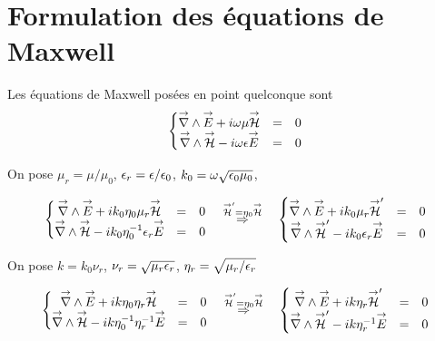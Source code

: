 \section{Formulation des équations de Maxwell}

Les équations de Maxwell posées en point quelconque sont
\begin{equation}
  \left\lbrace \begin{matrix}
  \vrot \vE + i\w\mu \vH &=& 0 \\
  \vrot \vH - i\w\eps \vE &=& 0 \\
  \end{matrix} \right.
\end{equation}

On pose \(\mu_r = \mu \slash \mu_0\), \(\eps_r = \eps \slash \eps_0\), \(k_0 = \w \sqrt {\eps_0\mu_0}\),

\begin{equation}
\left\lbrace \begin{matrix}
\vrot \vE + ik_0\eta_0\mu_r \vH &=& 0 \\
\vrot \vH - ik_0\eta_0^{-1}\eps_r \vE &=& 0 \\
\end{matrix} \right.
\quad
\overset{\vH' = \eta_0 \vH}{\Rightarrow}
\quad
\left\lbrace \begin{matrix}
\vrot \vE + ik_0\mu_r \vH' &=& 0 \\
\vrot \vH' - ik_0\eps_r \vE &=& 0 \\
\end{matrix} \right.
\end{equation}

On pose \(k=k_0\nu_r\), \(\nu_r = \sqrt{\mu_r\eps_r}\), \(\eta_r = \sqrt{\mu_r \slash \eps_r}\)

\begin{equation}
\left\lbrace \begin{matrix}
\vrot \vE + ik\eta_0\eta_r \vH &=& 0 \\
\vrot \vH - ik\eta_0^{-1}\eta_r^{-1} \vE &=& 0 \\
\end{matrix} \right.
\quad
\overset{\vH' = \eta_0 \vH}{\Rightarrow}
\quad
\left\lbrace \begin{matrix}
\vrot \vE + ik\eta_r \vH' &=& 0 \\
\vrot \vH' - ik\eta_r^{-1} \vE &=& 0 \\
\end{matrix} \right.
\end{equation}